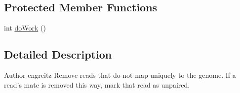 \subsection*{Protected Member Functions}
\begin{DoxyCompactItemize}
\item 
int \hyperlink{classbroad_1_1pda_1_1samtools_1_1_filter_paired_reads_by_m_a_q_a54e2b9af66397e0fb23a708a7b6c3281}{do\+Work} ()
\end{DoxyCompactItemize}


\subsection{Detailed Description}
\begin{DoxyAuthor}{Author}
engreitz Remove reads that do not map uniquely to the genome. If a read's mate is removed this way, mark that read as unpaired. 
\end{DoxyAuthor}


